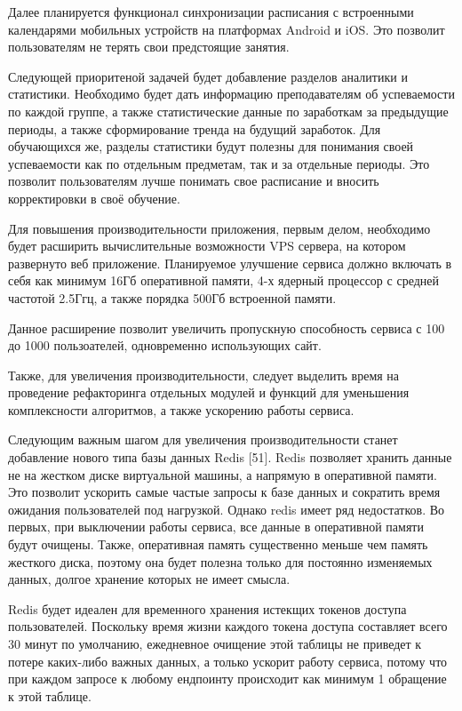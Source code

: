 \documentclass[a4paper,14pt,oneside]{extreport}
\begin{document}
Далее планируется функционал синхронизации расписания с встроенными календарями мобильных устройств на платформах Android и iOS. Это позволит пользователям не терять свои предстоящие занятия.

Следующей приоритеной задачей будет добавление разделов аналитики и статистики. Необходимо будет дать информацию преподавателям об успеваемости по каждой группе, а также статистические данные по заработкам за предыдущие периоды, а также сформирование тренда на будущий заработок.
Для обучающихся же, разделы статистики будут полезны для понимания своей успеваемости как по отдельным предметам, так и за отдельные периоды.
Это позволит пользователям лучше понимать свое расписание и вносить корректировки в своё обучение.

Для повышения производительности приложения, первым делом, необходимо будет расширить вычислительные возможности VPS сервера, на котором развернуто веб приложение. Планируемое улучшение сервиса должно включать в себя как минимум 16Гб оперативной памяти, 4-х ядерный процессор с средней частотой 2.5Ггц, а также порядка 500Гб встроенной памяти.

Данное расширение позволит увеличить пропускную способность сервиса с 100 до 1000 пользоателей, одновременно использующих сайт.

Также, для увеличения производительности, следует выделить время на проведение рефакторинга отдельных модулей и функций для уменьшения комплексности алгоритмов, а также ускорению работы сервиса.

Следующим важным шагом для увеличения производительности станет добавление нового типа базы данных Redis [51]. Redis позволяет хранить данные не на жестком диске виртуальной машины, а напрямую в оперативной памяти. Это позволит ускорить самые частые запросы к базе данных и сократить время ожидания пользователей под нагрузкой. Однако redis имеет ряд недостатков. Во первых, при выключении работы сервиса, все данные в оперативной памяти будут очищены. Также, оперативная память существенно меньше чем память жесткого диска, поэтому она будет полезна только для постоянно изменяемых данных, долгое хранение которых не имеет смысла.

Redis будет идеален для временного хранения истекщих токенов доступа пользователей. Поскольку время жизни каждого токена доступа составляет всего 30 минут по умолчанию, ежедневное очищение этой таблицы не приведет к потере каких-либо важных данных, а только ускорит работу сервиса, потому что при каждом запросе к любому ендпоинту происходит как минимум 1 обращение к этой таблице.
\end{document}
